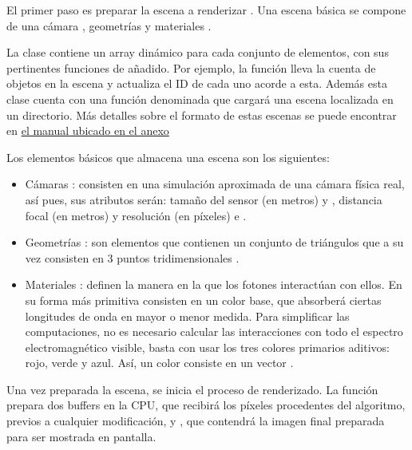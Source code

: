 El primer paso es preparar la escena a renderizar . Una escena básica se compone de una cámara , geometrías  y materiales .

La clase  contiene un array dinámico para cada conjunto de elementos, con sus pertinentes funciones de añadido. Por ejemplo, la función  lleva la cuenta de objetos en la escena y actualiza el ID de cada uno acorde a esta. Además esta clase cuenta con una función denominada  que cargará una escena localizada en un directorio. Más detalles sobre el formato de estas escenas se puede encontrar en \hyperref[sceneformat]{el manual ubicado en el anexo}

Los elementos básicos que almacena una escena son los siguientes:

\begin{itemize}

\item Cámaras : consisten en una simulación aproximada de una cámara física real, así pues, sus atributos serán: tamaño del sensor (en metros)  y , distancia focal (en metros)  y resolución (en píxeles)  e . 

\item Geometrías : son elementos que contienen un conjunto de triángulos  que a su vez consisten en 3 puntos tridimensionales .

\item Materiales : definen la manera en la que los fotones interactúan con ellos. En su forma más primitiva consisten en un color base, que absorberá ciertas longitudes de onda en mayor o menor medida. Para simplificar las computaciones, no es necesario calcular las interacciones con todo el espectro electromagnético visible, basta con usar los tres colores primarios aditivos: rojo, verde y azul. Así, un color consiste en un vector .

\end{itemize}

Una vez preparada la escena, se inicia el proceso de renderizado. La función  prepara dos buffers en la CPU,  que recibirá los píxeles procedentes del algoritmo, previos a cualquier modificación, y , que contendrá la imagen final preparada para ser mostrada en pantalla. 


